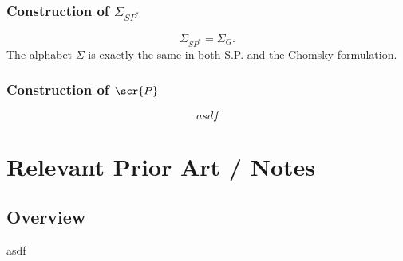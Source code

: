 \documentclass[10pt]{article}
\begin{document}
\subsubsection{Construction of $\Sigma_{SP^*}$}
\label{sec:construction-of-sigma}
\begin{equation}\label{eq:alphabet}
  \Sigma_{SP^*} = \Sigma_G.
\end{equation}
The alphabet $\Sigma$ is exactly the same in both S.P. and the Chomsky formulation.

\subsubsection{Construction of $\scr{P}$}
\label{sec:construction-of-p}
\begin{equation}
  \label{eq:productions-reduction}
  asdf
\end{equation}

\section{Relevant Prior Art / Notes}
\subsection{Overview}
\label{sec:overview}

asdf
\end{document}
